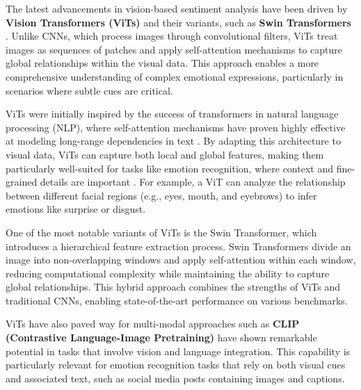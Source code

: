 The latest advancements in vision-based sentiment analysis have been driven by \textbf{Vision Transformers (ViTs)} \cite{dosovitskiy2021imageworth16x16words} and their variants, such as \textbf{Swin Transformers} \cite{liu2021swintransformerhierarchicalvision}. Unlike CNNs, which process images through convolutional filters, ViTs treat images as sequences of patches and apply self-attention mechanisms to capture global relationships within the visual data. This approach enables a more comprehensive understanding of complex emotional expressions, particularly in scenarios where subtle cues are critical.
\newline

ViTs were initially inspired by the success of transformers in natural language processing (NLP), where self-attention mechanisms have proven highly effective at modeling long-range dependencies in text \cite{vaswani2023attentionneed}. By adapting this architecture to visual data, ViTs can capture both local and global features, making them particularly well-suited for tasks like emotion recognition, where context and fine-grained details are important \cite{dosovitskiy2021imageworth16x16words}. For example, a ViT can analyze the relationship between different facial regions (e.g., eyes, mouth, and eyebrows) to infer emotions like surprise or disgust.
\newline

One of the most notable variants of ViTs is the Swin Transformer, which introduces a hierarchical feature extraction process. Swin Transformers divide an image into non-overlapping windows and apply self-attention within each window, reducing computational complexity while maintaining the ability to capture global relationships. This hybrid approach combines the strengths of ViTs and traditional CNNs, enabling state-of-the-art performance on various benchmarks. 
\newline

ViTs have also paved way for multi-modal approaches such as \textbf{CLIP (Contrastive Language-Image Pretraining)} \cite{radford2021learningtransferablevisualmodels} have shown remarkable potential in tasks that involve vision and language integration. This capability is particularly relevant for emotion recognition tasks that rely on both visual cues and associated text, such as social media posts containing images and captions.
\newline

